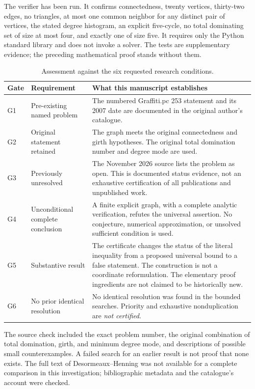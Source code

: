 \documentclass[11pt,a4paper]{article}
\theoremstyle{definition}
\theoremstyle{remark}
\begin{document}
The verifier has been run. It confirms connectedness, twenty
vertices, thirty-two edges, no triangles, at most one common
neighbor for any distinct pair of vertices, the stated degree
histogram, an explicit five-cycle, no total dominating set of
size at most four, and exactly one of size five. It requires only
the Python standard library and does not invoke a solver.
The tests are supplementary evidence; the preceding mathematical
proof stands without them.

\begin{table}[htbp]
\centering
\caption{Assessment against the six requested research conditions.}
\label{tab:gates}
\small
\begin{tabularx}{\linewidth}{@{}p{.07\linewidth}>{\raggedright\arraybackslash}p{.22\linewidth}X@{}}
\toprule
Gate & Requirement & What this manuscript establishes\\
\midrule
G1 & Pre-existing named problem &
The numbered Graffiti.pc 253 statement and its 2007 date are
documented in the original author's catalogue.\\[4pt]
G2 & Original statement retained &
The graph meets the original connectedness and girth hypotheses.
The original total domination number and degree mode are used.\\[4pt]
G3 & Previously unresolved &
The November 2026 source lists the problem as open. This is
documented status evidence, not an exhaustive certification of
all publications and unpublished work.\\[4pt]
G4 & Unconditional complete conclusion &
A finite explicit graph, with a complete analytic verification,
refutes the universal assertion. No conjecture, numerical
approximation, or unsolved sufficient condition is used.\\[4pt]
G5 & Substantive result &
The certificate changes the status of the literal inequality
from a proposed universal bound to a false statement. The
construction is not a coordinate reformulation. The elementary
proof ingredients are not claimed to be historically new.\\[4pt]
G6 & No prior identical resolution &
No identical resolution was found in the bounded searches.
Priority and exhaustive nonduplication are \emph{not certified}.\\
\bottomrule
\end{tabularx}
\end{table}

The source check included the exact problem number, the original
combination of total domination, girth, and minimum degree mode,
and descriptions of possible small counterexamples.
A failed search for an earlier result is not proof that
none exists. The full text of Desormeaux--Henning \cite{DH} was not
available for a complete comparison in this investigation;
bibliographic metadata and the catalogue's account were checked.
\end{document}
